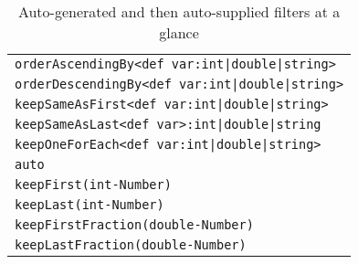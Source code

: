 \begin{table}[htbp]
\centering
\begin{tabular}{|l|}
\hline
\texttt{orderAscendingBy<def var:int|double|string>}\\
\texttt{orderDescendingBy<def var:int|double|string>}\\
\texttt{keepSameAsFirst<def var:int|double|string>}\\
\texttt{keepSameAsLast<def var>:int|double|string}\\
\texttt{keepOneForEach<def var:int|double|string>}\\
\texttt{auto}\\
\hline
\texttt{keepFirst(int-Number)}\\
\texttt{keepLast(int-Number)}\\
\texttt{keepFirstFraction(double-Number)}\\
\texttt{keepLastFraction(double-Number)}\\
\hline
\end{tabular}
\caption{Auto-generated and then auto-supplied filters at a glance}
\label{filterstab}
\end{table}


